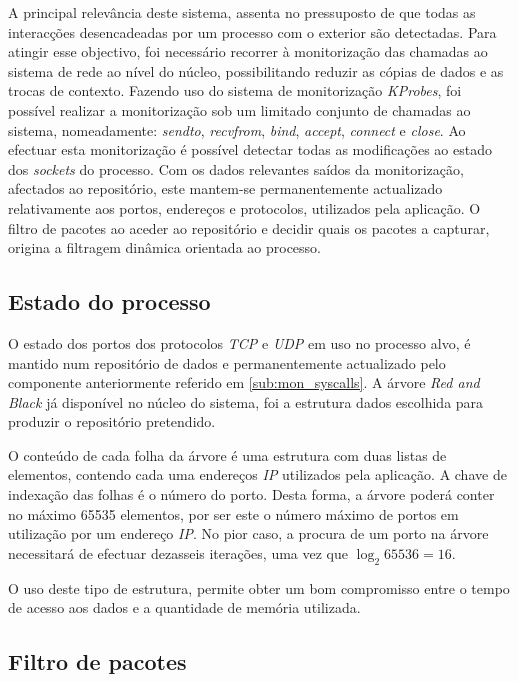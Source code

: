 A principal relevância deste sistema, assenta no pressuposto de que todas as interacções desencadeadas por um processo com o exterior são detectadas.
Para atingir esse objectivo, foi necessário recorrer à monitorização das chamadas ao sistema de rede ao nível do núcleo, possibilitando reduzir as cópias de dados e as trocas de contexto.
Fazendo uso do sistema de monitorização \textit{KProbes}, foi possível realizar a monitorização sob um limitado conjunto de chamadas ao sistema, nomeadamente: \textit{sendto}, \textit{recvfrom}, \textit{bind}, \textit{accept}, \textit{connect} e \textit{close}.
Ao efectuar esta monitorização é possível detectar todas as modificações ao estado dos \textit{sockets} do processo.
Com os dados relevantes saídos da monitorização, afectados ao repositório, este mantem-se permanentemente actualizado relativamente aos portos, endereços e protocolos, utilizados pela aplicação.
O filtro de pacotes ao aceder ao repositório e decidir quais os pacotes a capturar, origina a filtragem dinâmica orientada ao processo.


\subsection{Estado do processo}
\label{sub:data_repository}

O estado dos portos dos protocolos \textit{TCP} e \textit{UDP} em uso no processo alvo, é mantido num repositório de dados e permanentemente actualizado pelo componente anteriormente referido em \ref{sub:mon_syscalls}.
A árvore \textit{Red and Black} já disponível no núcleo do sistema, foi a estrutura dados escolhida para produzir o repositório pretendido.

O conteúdo de cada folha da árvore é uma estrutura com duas listas de elementos, contendo cada uma endereços \textit{IP} utilizados pela aplicação.
A chave de indexação das folhas é o número do porto.
Desta forma, a árvore poderá conter no máximo 65535 elementos, por ser este o número máximo de portos em utilização por um endereço \textit{IP}.
No pior caso, a procura de um porto na árvore necessitará de efectuar dezasseis iterações, uma vez que \begin{math}\log _2 65536 = 16 \end{math}.

O uso deste tipo de estrutura, permite obter um bom compromisso entre o tempo de acesso aos dados e a quantidade de memória utilizada.

\subsection{Filtro de pacotes}
\label{sub:packet_filter}

